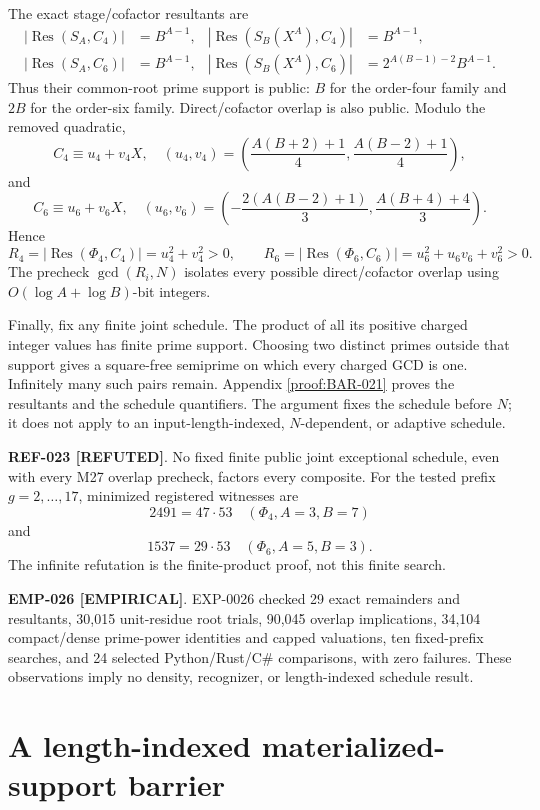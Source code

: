 \documentclass[11pt]{article}
\newcommand{\claimstatus}[2]{\textbf{#1 [#2]}}
\begin{document}
The exact stage/cofactor resultants are
\[
\begin{aligned}
|\operatorname{Res}(S_A,C_4)|&=B^{A-1},&
|\operatorname{Res}(S_B(X^A),C_4)|&=B^{A-1},\\
|\operatorname{Res}(S_A,C_6)|&=B^{A-1},&
|\operatorname{Res}(S_B(X^A),C_6)|
 &=2^{A(B-1)-2}B^{A-1}.
\end{aligned}
\]
Thus their common-root prime support is public: \(B\) for the order-four
family and \(2B\) for the order-six family. Direct/cofactor overlap is also
public. Modulo the removed quadratic,
\[
C_4\equiv u_4+v_4X,\quad
(u_4,v_4)=
\left(\frac{A(B+2)+1}{4},\frac{A(B-2)+1}{4}\right),
\]
and
\[
C_6\equiv u_6+v_6X,\quad
(u_6,v_6)=
\left(-\frac{2(A(B-2)+1)}{3},
\frac{A(B+4)+4}{3}\right).
\]
Hence
\[
R_4=|\operatorname{Res}(\Phi_4,C_4)|=u_4^2+v_4^2>0,
\qquad
R_6=|\operatorname{Res}(\Phi_6,C_6)|
=u_6^2+u_6v_6+v_6^2>0.
\]
The precheck \(\gcd(R_i,N)\) isolates every possible direct/cofactor overlap
using \(O(\log A+\log B)\)-bit integers.

Finally, fix any finite joint schedule. The product of all its positive
charged integer values has finite prime support. Choosing two distinct primes
outside that support gives a square-free semiprime on which every charged GCD
is one. Infinitely many such pairs remain. Appendix \ref{proof:BAR-021}
proves the resultants and the schedule quantifiers. The argument fixes the
schedule before \(N\); it does not apply to an input-length-indexed,
\(N\)-dependent, or adaptive schedule.

\claimstatus{REF-023}{REFUTED}. No fixed finite public joint exceptional
schedule, even with every M27 overlap precheck, factors every composite.
For the tested prefix \(g=2,\ldots,17\), minimized registered witnesses are
\[
2491=47\cdot53\quad(\Phi_4,A=3,B=7)
\]
and
\[
1537=29\cdot53\quad(\Phi_6,A=5,B=3).
\]
The infinite refutation is the finite-product proof, not this finite search.

\claimstatus{EMP-026}{EMPIRICAL}. EXP-0026 checked 29 exact remainders and
resultants, 30,015 unit-residue root trials, 90,045 overlap implications,
34,104 compact/dense prime-power identities and capped valuations, ten
fixed-prefix searches, and 24 selected Python/Rust/C\# comparisons, with
zero failures. These observations imply no density, recognizer, or
length-indexed schedule result.

\section{A length-indexed materialized-support barrier}
\end{document}
